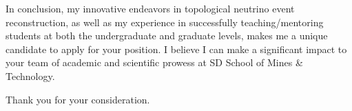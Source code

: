 \documentclass[10pt,a4paper,sans]{moderncv}        %
\begin{document}
In conclusion, my innovative endeavors in topological neutrino event
reconstruction, as well as my experience in successfully teaching/mentoring
students at both the undergraduate and graduate levels, makes me a unique
candidate to apply for your position. I believe I can make a significant impact
to your team of academic and scientific prowess at SD School of Mines \&
Technology.

Thank you for your consideration.

\makeletterclosing
\end{document}
